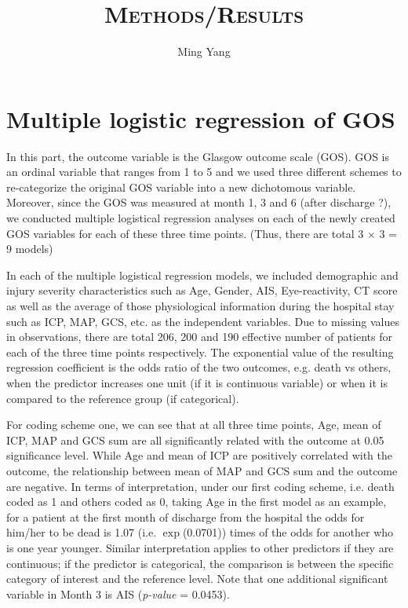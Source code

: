 \documentclass{article}
\begin{document}
\title{\textsc{Methods/Results}}
\author{Ming Yang}
\date{}
\maketitle

\tableofcontents
\newpage


\section{Multiple logistic regression of GOS} 
In this part, the outcome variable is the Glasgow outcome scale (GOS). GOS is an ordinal variable that ranges from 1 to 5 and we used three different schemes to re-categorize the original GOS variable into a new dichotomous variable. Moreover, since the GOS was measured at month 1, 3 and 6 (after discharge ?), we conducted multiple logistical regression analyses on each of the newly created GOS variables for each of these three time points. (Thus, there are total 3 $\times$ 3 = 9 models)

In each of the multiple logistical regression models, we included demographic and injury severity characteristics such as Age, Gender, AIS, Eye-reactivity, CT score as well as the average of those physiological information during the hospital stay such as ICP, MAP, GCS, etc. as the independent variables. Due to missing values in observations, there are total 206, 200 and 190 effective number of patients for each of the three time points respectively. The exponential value of the resulting regression coefficient is the odds ratio of the two outcomes, e.g. death vs others, when the predictor increases one unit (if it is continuous variable) or when it is compared to the reference group (if categorical).

For coding scheme one, we can see that at all three time points, Age, mean of ICP, MAP and GCS sum are all significantly related with the outcome at 0.05 significance level. While Age and mean of ICP are positively correlated with the outcome, the relationship between mean of MAP and GCS sum and the outcome are negative. In terms of interpretation, under our first coding scheme, i.e. death coded as 1 and others coded as 0, taking Age in the first model as an example, for a patient at the first month of discharge from the hospital the odds for him/her to be dead is 1.07 (i.e. $\exp$(0.0701)) times of the odds for another who is one year younger. Similar interpretation applies to other predictors if they are continuous; if the predictor is categorical, the comparison is between the specific category of interest and the reference level. Note that one additional significant variable in Month 3 is AIS (\emph{p-value} = 0.0453).
\end{document}

